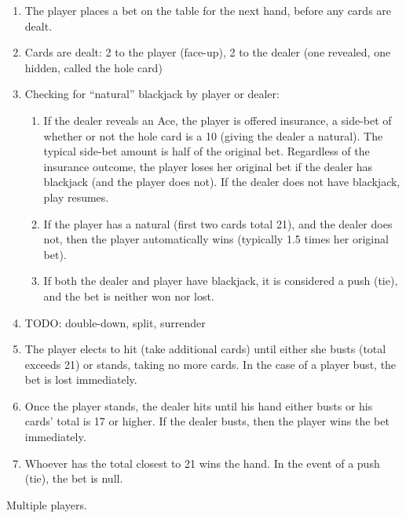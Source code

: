 \begin{enumerate}
\item The player places a bet on the table for the next hand, 
before any cards are dealt.
\item Cards are dealt: 2 to the player (face-up), 
2 to the dealer (one revealed, one hidden, called the hole card)
\item Checking for ``natural'' blackjack by player or dealer:
\begin{enumerate}
\item If the dealer reveals an Ace, the player is offered insurance,
a side-bet of whether or not the hole card is a 10 (giving the dealer a natural).
The typical side-bet amount is half of the original bet.
Regardless of the insurance outcome, the player loses her original bet
if the dealer has blackjack (and the player does not).
If the dealer does not have blackjack, play resumes.  
\item If the player has a natural (first two cards total 21), 
and the dealer does not, then the player automatically wins
(typically 1.5 times her original bet).
\item If both the dealer and player have blackjack, it is considered
a push (tie), and the bet is neither won nor lost.  
\end{enumerate}
\item TODO: double-down, split, surrender
\item The player elects to hit (take additional cards) until either
she busts (total exceeds 21) or stands, taking no more cards.
In the case of a player bust, the bet is lost immediately.
\item Once the player stands, the dealer hits until his hand either busts
or his cards' total is 17 or higher.  
If the dealer busts, then the player wins the bet immediately.  
\item Whoever has the total closest to 21 wins the hand.
In the event of a push (tie), the bet is null.
\end{enumerate}

Multiple players.

